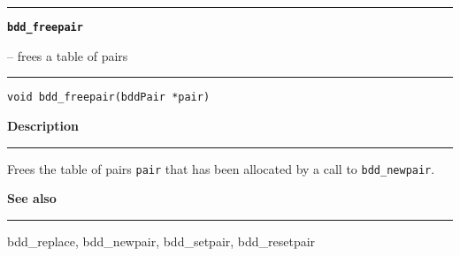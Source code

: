\begin{minipage}{\textwidth}

\noindent\begin{minipage}{\textwidth}
\rule{\textwidth}{0.5mm}
{\tt\bf bdd\_freepair }
\--- frees a table of pairs  \hspace{\fill}
\\\rule[1.5ex]{\textwidth}{0.5mm}
\end{minipage}

\noindent\begin{verbatim}
void bdd_freepair(bddPair *pair) 
\end{verbatim}

\vspace{\parsep}\noindent
{\bf Description}\\\rule[1.5ex]{\textwidth}{0.2mm}\vspace{-1.5ex}\setlength{\parindent}{1em}
Frees the table of pairs {\tt pair} that has been allocated
           by a call to {\tt bdd\_newpair}. 

\vspace{\parsep}\vspace{\baselineskip}\noindent
{\bf See also}\\\rule[1.5ex]{\textwidth}{0.2mm}\vspace{-1.5ex}
bdd\_replace, bdd\_newpair, bdd\_setpair, bdd\_resetpair 
\end{minipage}
\vspace{8ex}
